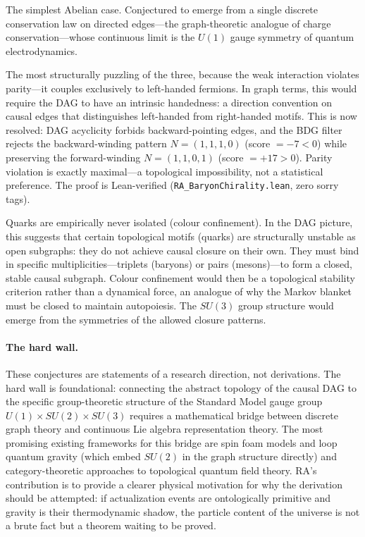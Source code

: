 \documentclass[11pt,a4paper]{article}
\theoremstyle{plain}
\theoremstyle{definition}
\theoremstyle{remark}
\begin{document}
\begin{description}[leftmargin=1.5em]
  \item[\textbf{Electromagnetism ($U(1)$)}] The simplest Abelian case.
  Conjectured to emerge from a single discrete conservation law on directed
  edges---the graph-theoretic analogue of charge conservation---whose
  continuous limit is the $U(1)$ gauge symmetry of quantum electrodynamics.

  \item[\textbf{The Weak Force ($SU(2)$) and Chirality}] The most
  structurally puzzling of the three, because the weak interaction violates
  parity---it couples exclusively to left-handed fermions. In graph terms, this
  would require the DAG to have an intrinsic handedness: a direction convention
  on causal edges that distinguishes left-handed from right-handed motifs. This
  is now resolved: DAG acyclicity forbids backward-pointing edges, and the BDG
  filter rejects the backward-winding pattern $N=(1,1,1,0)$ (score $= -7 < 0$)
  while preserving the forward-winding $N=(1,1,0,1)$ (score $= +17 > 0$).
  Parity violation is exactly maximal---a topological impossibility, not a
  statistical preference. The proof is Lean-verified
  (\texttt{RA\_BaryonChirality.lean}, zero sorry tags).

  \item[\textbf{The Strong Force ($SU(3)$) and Confinement}] Quarks are
  empirically never isolated (colour confinement). In the DAG picture, this
  suggests that certain topological motifs (quarks) are structurally unstable as
  open subgraphs: they do not achieve causal closure on their own. They must
  bind in specific multiplicities---triplets (baryons) or pairs (mesons)---to
  form a closed, stable causal subgraph. Colour confinement would then be a
  topological stability criterion rather than a dynamical force, an analogue of
  why the Markov blanket must be closed to maintain autopoiesis. The $SU(3)$
  group structure would emerge from the symmetries of the allowed closure
  patterns.
\end{description}

\paragraph{The hard wall.}
These conjectures are statements of a research direction, not derivations. The
hard wall is foundational: connecting the abstract topology of the causal DAG to
the specific group-theoretic structure of the Standard Model gauge group
$U(1) \times SU(2) \times SU(3)$ requires a mathematical bridge between discrete
graph theory and continuous Lie algebra representation theory. The most promising
existing frameworks for this bridge are spin foam models and loop quantum gravity
(which embed $SU(2)$ in the graph structure directly) and category-theoretic
approaches to topological quantum field theory. RA's contribution is to provide
a clearer physical motivation for why the derivation should be attempted: if
actualization events are ontologically primitive and gravity is their thermodynamic
shadow, the particle content of the universe is not a brute fact but a theorem
waiting to be proved.
\end{document}
